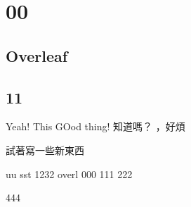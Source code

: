 
\chapter{00}
\section{Overleaf}
\section{11}

Yeah!
This
GOod thing! 知道嗎？
，好煩

試著寫一些新東西


uu
sst
1232
overl
000
111
222

444